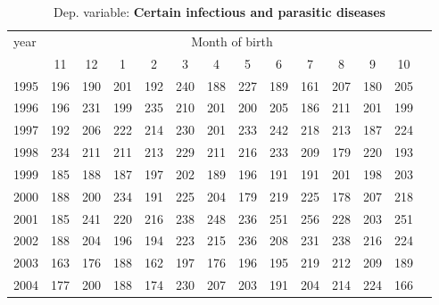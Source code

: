  \begin{table}[H] \begin{threeparttable} \centering \caption{Dep. variable: \textbf{Certain infectious and parasitic diseases}} {\def\sym#1{\ifmmode^{#1}\else\(^{#1}\)\fi} \begin{tabular}{l*{13}{c}} \toprule year & \multicolumn{12}{c}{Month of birth} \\ \cmidrule(lr){2-13} 
            &          11&          12&           1&           2&           3&           4&           5&           6&           7&           8&           9&          10\\
1995        &         196&         190&         201&         192&         240&         188&         227&         189&         161&         207&         180&         205\\
1996        &         196&         231&         199&         235&         210&         201&         200&         205&         186&         211&         201&         199\\
1997        &         192&         206&         222&         214&         230&         201&         233&         242&         218&         213&         187&         224\\
1998        &         234&         211&         211&         213&         229&         211&         216&         233&         209&         179&         220&         193\\
1999        &         185&         188&         187&         197&         202&         189&         196&         191&         191&         201&         198&         203\\
2000        &         188&         200&         234&         191&         225&         204&         179&         219&         225&         178&         207&         218\\
2001        &         185&         241&         220&         216&         238&         248&         236&         251&         256&         228&         203&         251\\
2002        &         188&         204&         196&         194&         223&         215&         236&         208&         231&         238&         216&         224\\
2003        &         163&         176&         188&         162&         197&         176&         196&         195&         219&         212&         209&         189\\
2004        &         177&         200&         188&         174&         230&         207&         203&         191&         204&         214&         224&         166\\

\end{tabular}}
\end{threeparttable}
\end{table}
